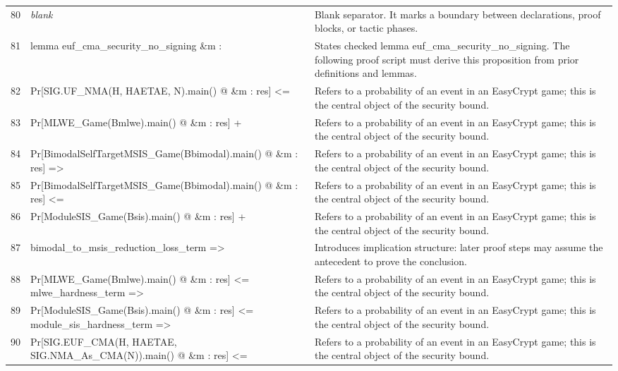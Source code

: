 \documentclass[10pt]{article}
\begin{document}
\begin{longtable}{r L{0.53\textwidth} L{0.37\textwidth}}
80 & {\ttfamily\scriptsize \emph{blank}} & Blank separator.  It marks a boundary between declarations, proof blocks, or tactic phases. \\
81 & {\ttfamily\scriptsize lemma euf\_cma\_security\_no\_signing \&m :} & States checked lemma euf\_cma\_security\_no\_signing.  The following proof script must derive this proposition from prior definitions and lemmas. \\
82 & {\ttfamily\scriptsize   Pr[SIG.UF\_NMA(H, HAETAE, N).main() @ \&m : res] <=} & Refers to a probability of an event in an EasyCrypt game; this is the central object of the security bound. \\
83 & {\ttfamily\scriptsize     Pr[MLWE\_Game(Bmlwe).main() @ \&m : res] +} & Refers to a probability of an event in an EasyCrypt game; this is the central object of the security bound. \\
84 & {\ttfamily\scriptsize     Pr[BimodalSelfTargetMSIS\_Game(Bbimodal).main() @ \&m : res] =>} & Refers to a probability of an event in an EasyCrypt game; this is the central object of the security bound. \\
85 & {\ttfamily\scriptsize   Pr[BimodalSelfTargetMSIS\_Game(Bbimodal).main() @ \&m : res] <=} & Refers to a probability of an event in an EasyCrypt game; this is the central object of the security bound. \\
86 & {\ttfamily\scriptsize     Pr[ModuleSIS\_Game(Bsis).main() @ \&m : res] +} & Refers to a probability of an event in an EasyCrypt game; this is the central object of the security bound. \\
87 & {\ttfamily\scriptsize     bimodal\_to\_msis\_reduction\_loss\_term =>} & Introduces implication structure: later proof steps may assume the antecedent to prove the conclusion. \\
88 & {\ttfamily\scriptsize   Pr[MLWE\_Game(Bmlwe).main() @ \&m : res] <= mlwe\_hardness\_term =>} & Refers to a probability of an event in an EasyCrypt game; this is the central object of the security bound. \\
89 & {\ttfamily\scriptsize   Pr[ModuleSIS\_Game(Bsis).main() @ \&m : res] <= module\_sis\_hardness\_term =>} & Refers to a probability of an event in an EasyCrypt game; this is the central object of the security bound. \\
90 & {\ttfamily\scriptsize   Pr[SIG.EUF\_CMA(H, HAETAE, SIG.NMA\_As\_CMA(N)).main() @ \&m : res] <=} & Refers to a probability of an event in an EasyCrypt game; this is the central object of the security bound. \\

\end{longtable}
\end{document}
